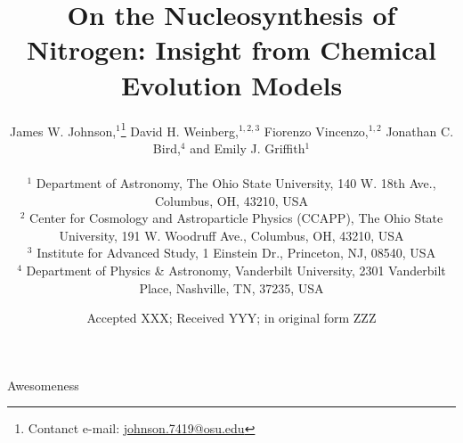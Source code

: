 \documentclass[fleqn, usenatbib]{mnras}
\title[On the Nucleosynthesis of Nitrogen]{On the Nucleosynthesis of Nitrogen: 
Insight from Chemical Evolution Models}
\author[J.W. Johnson et al.]{James W. Johnson,$^{1}$\thanks{
	Contanct e-mail: \href{mailto:
	johnson.7419@osu.edu}{johnson.7419@osu.edu}} 
	David H. Weinberg,$^{1, 2, 3}$ 
	Fiorenzo Vincenzo,$^{1, 2}$ 
	Jonathan C. Bird,$^{4}$ 
	\newauthor 
	and Emily J. Griffith$^{1}$ 
	\\ \null \\ 
	$^{1}$ Department of Astronomy, The Ohio State University, 
	140 W. 18th Ave., Columbus, OH, 43210, USA 
	\\ 
	$^{2}$ Center for Cosmology and Astroparticle Physics (CCAPP), 
	The Ohio State University, 191 W. Woodruff Ave., Columbus, OH, 43210, USA 
	\\ 
	$^{3}$ Institute for Advanced Study, 1 Einstein Dr., Princeton, NJ, 08540, 
	USA 
	\\ 
	$^{4}$ Department of Physics \& Astronomy, Vanderbilt University, 
	2301 Vanderbilt Place, Nashville, TN, 37235, USA 
}
\date{Accepted XXX; Received YYY; in original form ZZZ}
\begin{document}
 
\label{firstpage} 
\pagerange{\pageref{firstpage}--\pageref{lastpage}} 
\maketitle 

 

\begin{keywords} 
Awesomeness 
\end{keywords} 

 
 

 
 

\label{lastpage} 
\end{document}
